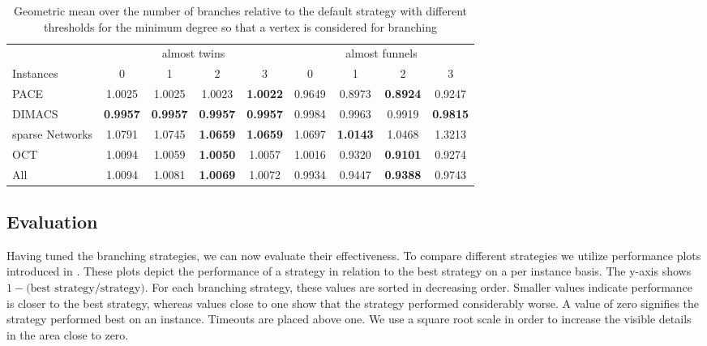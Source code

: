 \documentclass[12pt,a4paper,twoside]{scrartcl}
\numberwithin{equation}{section}
\begin{document}
\begin{table}[hbt!]
	\centering
	\begin{tabular}{l|cccc|cccc|}	  & \multicolumn{4}{c|}{almost twins} & \multicolumn{4}{c|}{almost funnels} \\
		Instances & 0 & 1 & 2 & 3 & 0 & 1 & 2 & 3 \\ \hline
		PACE & 1.0025 & 1.0025 & 1.0023 & \textbf{1.0022} & 0.9649 & 0.8973 & \textbf{0.8924} & 0.9247 \\		
		DIMACS & \textbf{0.9957} & \textbf{0.9957} & \textbf{0.9957} & \textbf{0.9957} & 0.9984 & 0.9963 & 0.9919 & \textbf{0.9815} \\		
		sparse Networks & 1.0791 & 1.0745 & \textbf{1.0659} & \textbf{1.0659} & 1.0697 & \textbf{1.0143} & 1.0468 & 1.3213  \\
		OCT & 1.0094 & 1.0059 & \textbf{1.0050} & 1.0057 & 1.0016 & 0.9320 & \textbf{0.9101} & 0.9274\\		
		All & 1.0094 & 1.0081 & \textbf{1.0069} & 1.0072 & 0.9934 & 0.9447 & \textbf{0.9388} & 0.9743  \\
	\end{tabular}
	\caption{Geometric mean over the number of branches relative to the default strategy with different thresholds for the minimum degree so that a vertex is considered for branching}
	\label{tab:tune4}
	
\end{table}



\subsection{Evaluation} \label{eval}
Having tuned the branching strategies, we can now evaluate their effectiveness. To compare different strategies we utilize performance plots introduced in \cite{performance}. These plots depict the performance of a strategy in relation to the best strategy on a per instance basis. The y-axis shows $1-\text{(best strategy/strategy)}$. For each branching strategy, these values are sorted in decreasing order. Smaller values indicate performance is closer to the best strategy, whereas values close to one show that the strategy performed considerably worse. A value of zero signifies the strategy performed best on an instance. Timeouts are placed above one. We use a square root scale in order to increase the visible details in the area close to zero. 
\end{document}
